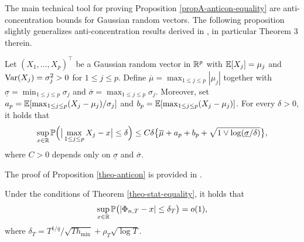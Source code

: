\documentclass[a4paper,12pt]{article}
\begin{document}
The main technical tool for proving Proposition \ref{propA-anticon-equality} are anti-concentration bounds for Gaussian random vectors. The following proposition slightly generalizes anti-\linebreak concentration results derived in \cite{Chernozhukov2015}, in particular Theorem 3 therein.

\begin{propA}\label{theo-anticon}
Let $(X_1,\ldots,X_p)^\top$ be a Gaussian random vector in $\mathbb{R}^p$ with $\mathbb{E}[X_j] = \mu_j$ and $\textnormal{Var}(X_j) = \sigma_j^2 > 0$ for $1 \le j \le p$. Define $\overline{\mu} = \max_{1 \le j \le p} |\mu_j|$ together with $\underline{\sigma} = \min_{1 \le j \le p} \sigma_j$ and $\overline{\sigma} = \max_{1 \le j \le p} \sigma_j$. Moreover, set $a_p = \mathbb{E}[ \max_{1 \le j \le p} (X_j-\mu_j)/\sigma_j ]$ and $b_p = \mathbb{E}[ \max_{1 \le j \le p} (X_j-\mu_j) ]$. For every $\delta > 0$, it holds that
\[ \sup_{x \in \mathbb{R}} \mathbb{P} \Big( \big| \max_{1 \le j \le p} X_j - x \big| \le \delta \Big) \le C \delta \big\{ \overline{\mu} + a_p + b_p + \sqrt{1 \vee \log(\underline{\sigma}/\delta)} \big\}, \]
where $C > 0$ depends only on $\underline{\sigma}$ and $\overline{\sigma}$. 
\end{propA} 
The proof of Proposition \ref{theo-anticon} is provided in \cite{KhismatullinaVogt2018}.


\begin{propA}\label{propA-anticon-equality}
Under the conditions of Theorem \ref{theo-stat-equality}, it holds that 
\begin{align}\label{eq-anticon-equality} \sup_{x \in \mathbb{R}} \mathbb{P} \big( | \Phi_{n,T} - x | \le \delta_T \big) = o(1),
\end{align}
where $\delta_T = T^{1/q} / \sqrt{T h_{\min}} + \rho_T \sqrt{\log T}$.
\end{propA}
\end{document}
